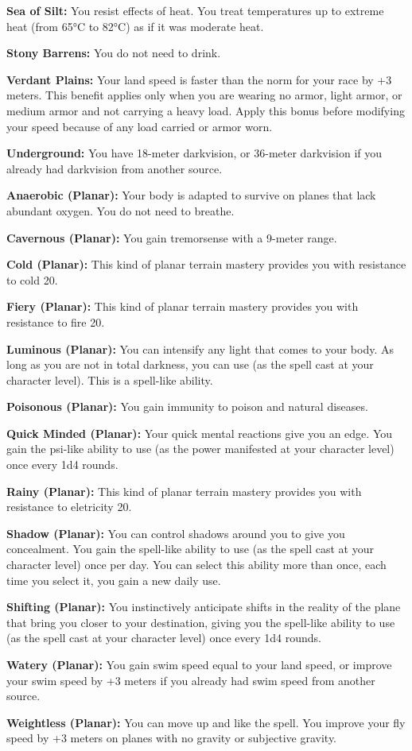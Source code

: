 {\textbf{Sea of Silt:} You resist effects of heat. You treat temperatures up to extreme heat (from 65°C to 82°C) as if it was moderate heat.

\textbf{Stony Barrens:} You do not need to drink.

\textbf{Verdant Plains:} Your land speed is faster than the norm for your race by +3 meters. This benefit applies only when you are wearing no armor, light armor, or medium armor and not carrying a heavy load. Apply this bonus before modifying your speed because of any load carried or armor worn.

\textbf{Underground:} You have 18-meter darkvision, or 36-meter darkvision if you already had darkvision from another source.


\textbf{Anaerobic (Planar):} Your body is adapted to survive on planes that lack abundant oxygen. You do not need to breathe.

\textbf{Cavernous (Planar):} You gain tremorsense with a 9-meter range.

\textbf{Cold (Planar):} This kind of planar terrain mastery provides you with resistance to cold 20.

\textbf{Fiery (Planar):} This kind of planar terrain mastery provides you with resistance to fire 20.

\textbf{Luminous (Planar):} You can intensify any light that comes to your body. As long as you are not in total darkness, you can use  (as the spell cast at your character level). This is a spell-like ability.

\textbf{Poisonous (Planar):} You gain immunity to poison and natural diseases.

\textbf{Quick Minded (Planar):} Your quick mental reactions give you an edge. You gain the psi-like ability to use  (as the power manifested at your character level) once every 1d4 rounds.

\textbf{Rainy (Planar):} This kind of planar terrain mastery provides you with resistance to eletricity 20.

\textbf{Shadow (Planar):} You can control shadows around you to give you concealment. You gain the spell-like ability to use  (as the spell cast at your character level) once per day. You can select this ability more than once, each time you select it, you gain a new daily use.

\textbf{Shifting (Planar):} You instinctively anticipate shifts in the reality of the plane that bring you closer to your destination, giving you the spell-like ability to use  (as the spell cast at your character level) once every 1d4 rounds.

\textbf{Watery (Planar):} You gain swim speed equal to your land speed, or improve your swim speed by +3 meters if you already had swim speed from another source.

\textbf{Weightless (Planar):} You can move up and like the  spell. You improve your fly speed by +3 meters on planes with no gravity or subjective gravity.

}
